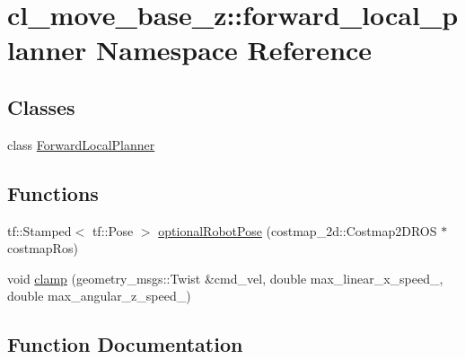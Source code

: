 \hypertarget{namespacecl__move__base__z_1_1forward__local__planner}{}\section{cl\+\_\+move\+\_\+base\+\_\+z\+:\+:forward\+\_\+local\+\_\+planner Namespace Reference}
\label{namespacecl__move__base__z_1_1forward__local__planner}
\subsection*{Classes}
\begin{DoxyCompactItemize}
\item 
class \hyperlink{classcl__move__base__z_1_1forward__local__planner_1_1ForwardLocalPlanner}{Forward\+Local\+Planner}
\end{DoxyCompactItemize}
\subsection*{Functions}
\begin{DoxyCompactItemize}
\item 
tf\+::\+Stamped$<$ tf\+::\+Pose $>$ \hyperlink{namespacecl__move__base__z_1_1forward__local__planner_a4c20f9fe0ca67779c53e90182baf4997}{optional\+Robot\+Pose} (costmap\+\_\+2d\+::\+Costmap2\+D\+R\+OS $\ast$costmap\+Ros)
\item 
void \hyperlink{namespacecl__move__base__z_1_1forward__local__planner_a6cd0f1c55d79df6809ad5d726e190607}{clamp} (geometry\+\_\+msgs\+::\+Twist \&cmd\+\_\+vel, double max\+\_\+linear\+\_\+x\+\_\+speed\+\_\+, double max\+\_\+angular\+\_\+z\+\_\+speed\+\_\+)
\end{DoxyCompactItemize}


\subsection{Function Documentation}
\mbox{\label{namespacecl__move__base__z_1_1forward__local__planner_a6cd0f1c55d79df6809ad5d726e190607}} 
